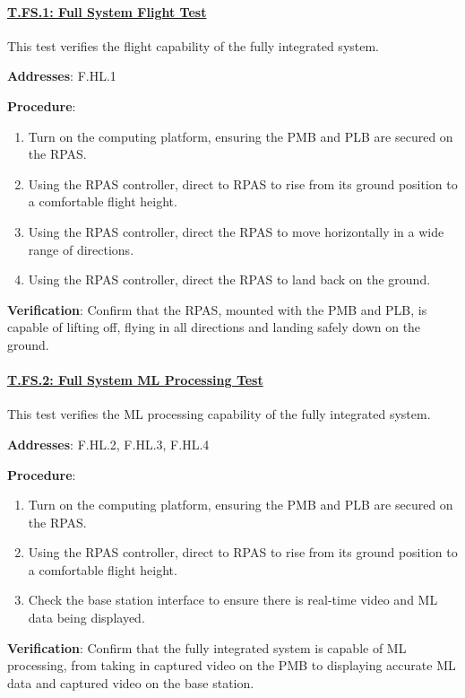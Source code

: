 \paragraph{\underline{T.FS.1: Full System Flight Test}}

This test verifies the flight capability of the fully integrated system.

\textbf{Addresses}: F.HL.1

\textbf{Procedure}:
\begin{enumerate}[noitemsep]
    \item Turn on the computing platform, ensuring the PMB and PLB are secured on the RPAS.
    \item Using the RPAS controller, direct to RPAS to rise from its ground position to a comfortable flight height.
    \item Using the RPAS controller, direct the RPAS to move horizontally in a wide range of directions.
    \item Using the RPAS controller, direct the RPAS to land back on the ground.
\end{enumerate}

\textbf{Verification}:
Confirm that the RPAS, mounted with the PMB and PLB, is capable of lifting off, flying in all directions and landing safely down on the ground.

%

\paragraph{\underline{T.FS.2: Full System ML Processing Test}}

This test verifies the ML processing capability of the fully integrated system.

\textbf{Addresses}: F.HL.2, F.HL.3, F.HL.4

\textbf{Procedure}:
\begin{enumerate}[noitemsep]
    \item Turn on the computing platform, ensuring the PMB and PLB are secured on the RPAS.
    \item Using the RPAS controller, direct to RPAS to rise from its ground position to a comfortable flight height.
    \item Check the base station interface to ensure there is real-time video and ML data being displayed.
\end{enumerate}

\textbf{Verification}:
Confirm that the fully integrated system is capable of ML processing, from taking in captured video on the PMB to displaying accurate ML data and captured video on the base station.
